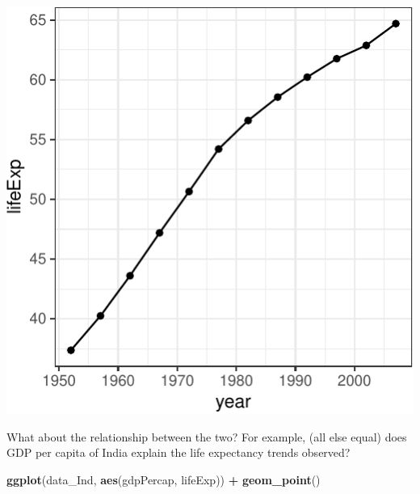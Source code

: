 \documentclass[12pt,]{article}
\newenvironment{Shaded}{\begin{snugshade}}{\end{snugshade}}
\newcommand{\KeywordTok}[1]{\textcolor[rgb]{0.13,0.29,0.53}{\textbf{#1}}}
\newcommand{\StringTok}[1]{\textcolor[rgb]{0.31,0.60,0.02}{#1}}
\newcommand{\OperatorTok}[1]{\textcolor[rgb]{0.81,0.36,0.00}{\textbf{#1}}}
\newcommand{\NormalTok}[1]{#1}
\begin{document}
\begin{center}\includegraphics{Intro_tips_tricks_files/figure-latex/data_Ind_lifeexp-1} \end{center}

What about the relationship between the two? For example, (all else
equal) does GDP per capita of India explain the life expectancy trends
observed?

\begin{Shaded}
\begin{Highlighting}[]
\KeywordTok{ggplot}\NormalTok{(data_Ind, }\KeywordTok{aes}\NormalTok{(gdpPercap, lifeExp)) }\OperatorTok{+}
\StringTok{  }\KeywordTok{geom_point}\NormalTok{() }
\end{Highlighting}
\end{Shaded}
\end{document}

